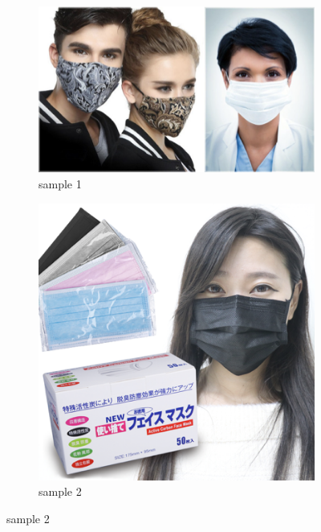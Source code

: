 \documentclass[10pt,a4paper]{report}
\begin{document}
\begin{figure}[hbtp]
     \centering
     \begin{subfigure}[b]{0.45\textwidth}
         \centering
         \includegraphics[width=\textwidth]{./imgs/maksssksksss81.png}
         \caption{sample 1}
         \label{fig:Oringial image}
     \end{subfigure}
     \hfill
     \begin{subfigure}[b]{0.45\textwidth}
         \centering
         \includegraphics[width=\textwidth]{./imgs/maksssksksss109.png}
         \caption{sample 2}
         \label{fig:Gray scale image}

\end{subfigure}
\end{figure}
\end{document}
